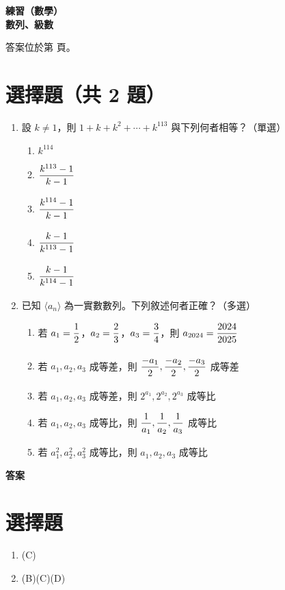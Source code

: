 \documentclass[10pt]{article}
\newcommand*{\fraction}[2]{\rule[-.8\baselineskip]{0pt}{2\baselineskip}\dfrac{#1}{#2}}
\renewcommand*{\maketitle}{{%
  \bfseries
  \LARGE 練習（數學） \\
  \large 數列、級數 \par
}}
\begin{document}
\maketitle
\medskip
答案位於第 \pageref{answer} 頁。
\section{選擇題（共 2 題）}
\begin{enumerate}[label=\arabic*.,align=left,leftmargin=*,labelsep=.3em]
  \item 設 $k \neq 1$，則 $1 + k + k^2 + \cdots + k^{113}$ 與下列何者相等？（單選）
  \begin{enumerate}[label=(\Alph*),align=left,leftmargin=*,labelsep=.3em]
    \item $k^{114}$
    \item $\fraction{k^{113}-1}{k-1}$
    \item $\fraction{k^{114}-1}{k-1}$
    \item $\fraction{k-1}{k^{113}-1}$
    \item $\fraction{k-1}{k^{114}-1}$
  \end{enumerate}
  \newpage
  \item 已知 $\langle a_n \rangle$ 為一實數數列。下列敘述何者正確？（多選）
  \begin{enumerate}[label=(\Alph*),align=left,leftmargin=*,labelsep=.3em]
    \item 若 $a_1 = \fraction{1}{2}$，$a_2 = \fraction{2}{3}$，$a_3 = \fraction{3}{4}$，則 $a_{2024} = \fraction{2024}{2025}$
    \item 若 $a_1, a_2, a_3$ 成等差，則 $\fraction{-a_1}{2}, \fraction{-a_2}{2}, \fraction{-a_3}{2}$ 成等差
    \item 若 $a_1, a_2, a_3$ 成等差，則 $2^{a_1}, 2^{a_2}, 2^{a_3}$ 成等比
    \item 若 $a_1, a_2, a_3$ 成等比，則 $\fraction{1}{a_1}, \fraction{1}{a_2}, \fraction{1}{a_3}$ 成等比
    \item 若 $a_1^2, a_2^2, a_3^2$ 成等比，則 $a_1, a_2, a_3$ 成等比
  \end{enumerate}
  \newpage
\end{enumerate}

\newpage
\label{answer}
{\bfseries\large 答案 \par}
\setcounter{section}{0}
\section{選擇題}
\begin{enumerate}[label=\arabic*.,left=0pt]
  \item (C)
  \item (B)(C)(D)
\end{enumerate}
\end{document}
